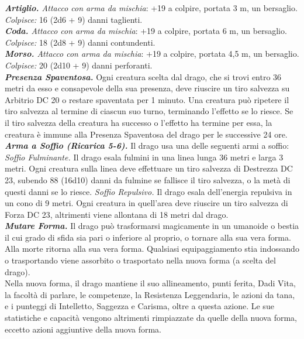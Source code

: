 \begin{multicols}{2}
\emph{\textbf{Artiglio.} Attacco con arma da mischia}: +19 a colpire, portata 3 m, un bersaglio.\\
\emph{Colpisce:} 16 (2d6 + 9) danni taglienti.\\
\emph{\textbf{Coda.} Attacco con arma da mischia}: +19 a colpire, portata 6 m, un bersaglio.\\
\emph{Colpisce:} 18 (2d8 + 9) danni contundenti.\\
\emph{\textbf{Morso.} Attacco con arma da mischia}: +19 a colpire, portata 4,5 m, un bersaglio.\\
\emph{Colpisce:} 20 (2d10 + 9) danni perforanti.\\
\emph{\textbf{Presenza Spaventosa.}} Ogni creatura scelta dal drago, che si trovi entro 36 metri da esso e consapevole della sua presenza, deve riuscire un tiro salvezza su Arbitrio DC 20 o restare spaventata per 1 minuto. Una creatura può ripetere il tiro salvezza al termine di ciascun suo turno, terminando l'effetto se lo riesce. Se il tiro salvezza della creatura ha successo o l'effetto ha termine per essa, la creatura è immune alla Presenza Spaventosa del drago per le successive 24 ore.\\
\emph{\textbf{Arma a Soffio (Ricarica 5-6).}} Il drago usa una delle seguenti armi a soffio:\\
\emph{Soffio Fulminante.} Il drago esala fulmini in una linea lunga 36 metri e larga 3 metri. Ogni creatura sulla linea deve effettuare un tiro salvezza di Destrezza DC 23, subendo 88 (16d10) danni da fulmine se fallisce il tiro salvezza, o la metà di questi danni se lo riesce. \emph{Soffio Repulsivo.} Il drago esala dell'energia repulsiva in un cono di 9 metri. Ogni creatura in quell'area deve riuscire un tiro salvezza di Forza DC 23, altrimenti viene allontana di 18 metri dal drago.\\
\emph{\textbf{Mutare Forma.}} Il drago può trasformarsi magicamente in un umanoide o bestia il cui grado di sfida sia pari o inferiore al proprio, o tornare alla sua vera forma. Alla morte ritorna alla sua vera forma. Qualsiasi equipaggiamento stia indossando o trasportando viene assorbito o trasportato nella nuova forma (a scelta del drago).\\
Nella nuova forma, il drago mantiene il suo allineamento, punti ferita, Dadi Vita, la facoltà di parlare, le competenze, la Resistenza Leggendaria, le azioni da tana, e i punteggi di Intelletto, Saggezza e Carisma, oltre a questa azione. Le sue statistiche e capacità vengono altrimenti rimpiazzate da quelle della nuova forma, eccetto azioni aggiuntive della nuova forma.\\

\end{multicols}
